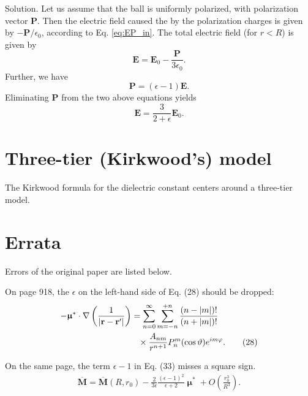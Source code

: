 \documentclass[11pt]{article}
\newcommand{\vct}[1]{\boldsymbol{\mathbf{#1}}}
\newcommand{\vr}{\vct{r}}
\newcommand{\vE}{\vct{E}}
\newcommand{\vP}{\vct{P}}
\newcommand{\vM}{\vct{M}}
\begin{document}
Solution.
Let us assume that the ball is uniformly polarized,
with polarization vector $\vP$.
Then the electric field caused the by the polarization charges
is given by $-\vP/\epsilon_0$,
according to Eq. \eqref{eq:EP_in}.
The total electric field (for $r < R$) is given by
\[
  \vE = \vE_0 - \frac{ \vP } { 3 \epsilon_0 }.
\]
Further, we have
\[
  \vP = (\epsilon - 1) \vE.
\]
Eliminating $\vP$ from the two above equations yields
\[
  \vE = \frac{ 3 } {2 + \epsilon} \vE_0.
\]



\section{Three-tier (Kirkwood's) model}



The Kirkwood formula for the dielectric constant centers around a three-tier model.




\section{Errata}



Errors of the original paper are listed below.

On page 918, the $\epsilon$ on the left-hand side of Eq. (28)
should be dropped:
\begin{align}
  -\vct\upmu^*\cdot
  \nabla
  \left(
    \frac { 1 }
    { |\vr - \vr'| }
  \right)
&=
  \sum_{n = 0}^\infty
  \sum_{m = -n}^{+n}
  \frac { ( n - |m| )! } { ( n + |m| )! }
  \notag
  \\
&\hphantom{=}\times
  \frac { A_{nm} } { r^{n + 1} }
  P_n^m(\cos\vartheta) e^{im \varphi}.
  \tag{28}
\end{align}

On the same page, the term $\epsilon - 1$ in Eq. (33) misses a square sign.
\begin{align}
\overline {\vM}
=
\overline {\vM}(R, r_0)
-
\frac{2}{3\epsilon}
\frac{(\epsilon - 1)^2}{\epsilon + 2}
\vct\upmu^*
+ O\left( \frac{ r_0^3 } { R^3 } \right).
\tag{33}
\end{align}




\end{document}
